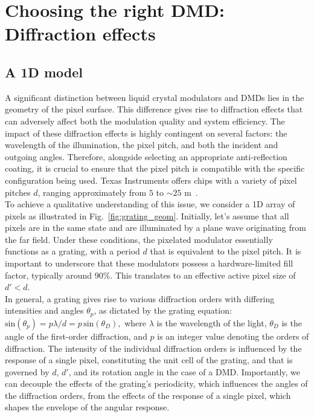 \documentclass[12pt]{iopart}
\begin{document}
\section{Choosing the right DMD: Diffraction effects}

\subsection{A 1D model}

A significant distinction between liquid crystal modulators and DMDs
lies in the geometry of the pixel surface.
This difference gives rise to diffraction effects that can adversely affect
both the modulation quality and system efficiency.
The impact of these diffraction effects is highly contingent on several factors:
the wavelength of the illumination, the pixel pitch, and both the incident and outgoing angles.
Therefore, alongside selecting an appropriate anti-reflection coating,
it is crucial to ensure that the pixel pitch is compatible with the specific configuration being used.
Texas Instruments offers chips with a variety of pixel pitches $d$,
ranging approximately from $5$ to $\sim25$ \textmu m~\cite{TI}.\\


To achieve a qualitative understanding of this issue,
we consider a 1D array of pixels as illustrated in Fig.~\ref{fig:grating_geom}.
Initially, let's assume that all pixels are in the same state and are illuminated by a plane wave originating from the far field.
Under these conditions, the pixelated modulator essentially functions as a grating,
with a period $d$ that is equivalent to the pixel pitch.
It is important to underscore that these modulators possess a hardware-limited fill factor,
typically around 90\%.
This translates to an effective active pixel size of $d' < d$.\\

In general, a grating gives rise to various diffraction orders
with differing intensities
and angles $\theta_p$, as dictated by the grating equation:
$
  \text{sin}(\theta_p) = p\lambda/d = p \, \text{sin}(\theta_D),
$
where $\lambda$ is the wavelength of the light,
$\theta_D$ is the angle of the first-order diffraction,
and $p$ is an integer value denoting the orders of diffraction.
The intensity of the individual diffraction orders is influenced by
the response of a single pixel,
constituting the unit cell of the grating,
and that is governed by $d$, $d'$, and its rotation angle in the case of a DMD.
Importantly, we can decouple the effects of the grating's periodicity,
which influences the angles of the diffraction orders,
from the effects of the response of a single pixel,
which shapes the envelope of the angular response.\\
\end{document}
